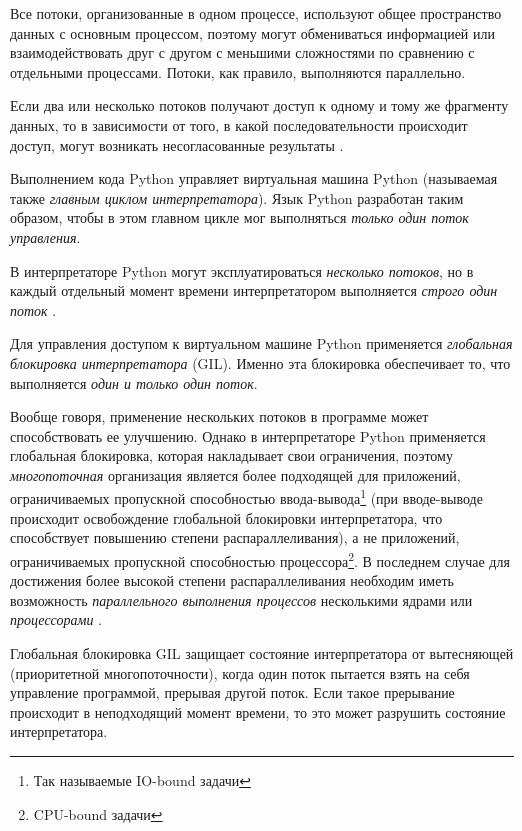 \documentclass[%
	11pt,
	a4paper,
	utf8,
		]{article}
\begin{document}
Все потоки, организованные в одном процессе, используют общее пространство данных с основным процессом, поэтому могут обмениваться информацией или взаимодействовать друг с другом с меньшими сложностями по сравнению с отдельными процессами. Потоки, как правило, выполняются параллельно.

Если два или несколько потоков получают доступ к одному и тому же фрагменту данных, то в зависимости от того, в какой последовательности происходит доступ, могут возникать несогласованные результаты \cite[]{chun:2015}.

Выполнением кода Python управляет виртуальная машина Python (называемая также \emph{главным циклом интерпретатора}). Язык Python разработан таким образом, чтобы в этом главном цикле мог выполняться \emph{только один поток управления}.

В интерпретаторе Python могут эксплуатироваться \emph{несколько потоков}, но в каждый отдельный момент времени интерпретатором выполняется \emph{строго один поток} \cite[]{chun:2015}.

Для управления доступом к виртуальном машине Python применяется \emph{глобальная блокировка интерпретатора} (GIL). Именно эта блокировка обеспечивает то, что выполняется \emph{один и только один поток}.

Вообще говоря, применение нескольких потоков в программе может способствовать ее улучшению. Однако в интерпретаторе Python применяется глобальная блокировка, которая накладывает свои ограничения, поэтому \emph{многопоточная} организация является более подходящей для приложений, ограничиваемых пропускной способностью ввода-вывода\footnote{Так называемые IO-bound задачи} (при вводе-выводе происходит освобождение глобальной блокировки интерпретатора, что способствует повышению степени распараллеливания), а не приложений, ограничиваемых пропускной способностью процессора\footnote{CPU-bound задачи}. В последнем случае для достижения более высокой степени распараллеливания необходим иметь возможность \emph{параллельного выполнения процессов} несколькими ядрами или \emph{процессорами} \cite[]{chun:2015}.

Глобальная блокировка GIL защищает состояние интерпретатора от вытесняющей (приоритетной многопоточности), когда один поток пытается взять на себя управление программой, прерывая другой поток. Если такое прерывание происходит в неподходящий момент времени, то это может разрушить состояние интерпретатора.
\end{document}
